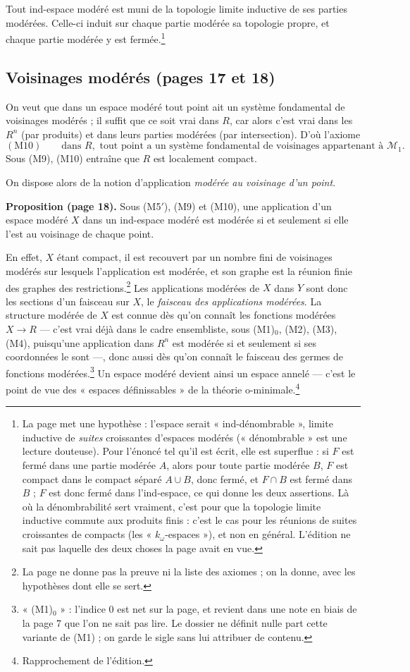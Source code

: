 \documentclass[11pt,a4paper]{article}
\begin{document}
Tout ind-espace modéré est muni de la topologie limite inductive de ses
parties modérées. Celle-ci induit sur chaque partie modérée sa topologie
propre, et chaque partie modérée y est fermée.\footnote{La page met une
hypothèse : l'espace serait « ind-dénombrable », limite inductive de
\emph{suites} croissantes d'espaces modérés (« dénombrable » est une lecture
douteuse). Pour l'énoncé tel qu'il est écrit, elle est superflue : si $F$ est
fermé dans une partie modérée $A$, alors pour toute partie modérée $B$, $F$
est compact dans le compact séparé $A \cup B$, donc fermé, et $F \cap B$ est
fermé dans $B$ ; $F$ est donc fermé dans l'ind-espace, ce qui donne les deux
assertions. Là où la dénombrabilité sert vraiment, c'est pour que la topologie
limite inductive commute aux produits finis : c'est le cas pour les réunions
de suites croissantes de compacts (les « $k_\omega$-espaces »), et non en
général. L'édition ne sait pas laquelle des deux choses la page avait en
vue.}

\subsection*{Voisinages modérés (pages 17 et 18)}

On veut que dans un espace modéré tout point ait un système fondamental de
voisinages modérés ; il suffit que ce soit vrai dans $R$, car alors c'est vrai
dans les $R^n$ (par produits) et dans leurs parties modérées (par
intersection). D'où l'axiome
\[ (\mathrm{M}10) \qquad \text{dans } R, \text{ tout point a un système
fondamental de voisinages appartenant à } \mathcal{M}_1 . \]
Sous (M9), (M10) entraîne que $R$ est localement compact.

On dispose alors de la notion d'application \emph{modérée au voisinage d'un
point}.

\textbf{Proposition (page 18).} Sous (M5$'$), (M9) et (M10), une application
d'un espace modéré $X$ dans un ind-espace modéré est modérée si et seulement si
elle l'est au voisinage de chaque point.

En effet, $X$ étant compact, il est recouvert par un nombre fini de voisinages
modérés sur lesquels l'application est modérée, et son graphe est la réunion
finie des graphes des restrictions.\footnote{La page ne donne pas la preuve ni
la liste des axiomes ; on la donne, avec les hypothèses dont elle se sert.}
Les applications modérées de $X$ dans $Y$ sont donc les sections d'un
faisceau sur $X$, le \emph{faisceau des applications modérées}. La structure
modérée de $X$ est connue dès qu'on connaît les fonctions modérées $X \to R$
— c'est vrai déjà dans le cadre ensembliste, sous (M1)$_0$, (M2), (M3), (M4),
puisqu'une application dans $R^n$ est modérée si et seulement si ses
coordonnées le sont —, donc aussi dès qu'on connaît le faisceau des germes de
fonctions modérées.\footnote{« (M1)$_0$ » : l'indice $0$ est net sur la page,
et revient dans une note en biais de la page 7 que l'on ne sait pas lire. Le
dossier ne définit nulle part cette variante de (M1) ; on garde le sigle sans
lui attribuer de contenu.} Un espace modéré devient ainsi un espace annelé —
c'est le point de vue des « espaces définissables » de la théorie
o-minimale.\footnote{Rapprochement de l'édition.}
\end{document}
